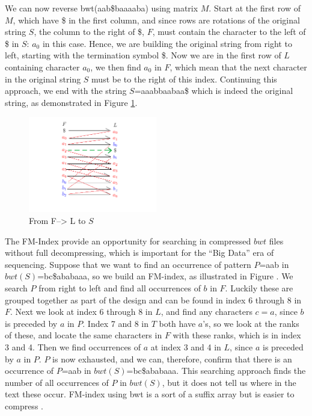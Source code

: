 \documentclass[12pt]{article} %
\begin{document}
We can now reverse bwt(aab\$baaaaba) using matrix $M$. Start at the first row of $M$, which have \$ in the first column, and since rows are rotations of the original string $S$, the column to the right of \$, $F$, must contain the character to the left of \$ in $S$: $a_0$ in this case. Hence, we are building the original string from right to left, starting with the termination symbol \$. Now we are in the first row of $L$ containing character $a_0$, we then find $a_0$ in $F$, which mean that the next character in the original string $S$ must be to the right of this index. Continuing this approach, we end with the string $S$=aaabbaabaa\$ which is indeed the original string, as demonstrated in Figure \ref{fig:bwt0}.
\begin{figure}[H]
    \centering
    \includegraphics[width=0.5\textwidth]{bwt0}
    \captionsetup{width=0.8\textwidth}
    \caption{ From F--> L to $S$}
    \label{fig:bwt0}
\end{figure}

The FM-Index provide an opportunity for searching in compressed $bwt$ files without full decompressing, which is important for the “Big Data” era of sequencing. 
Suppose that we want to find an occurrence of pattern $P$=aab in $bwt(S)$=bc\$ababaaa, so we build an FM-index, as illustrated in Figure \?.  We search $P$ from right to left and find all occurrences of $b$ in $F$. Luckily these are grouped together as part of the design and can be found in index 6 through 8 in $F$. Next we look at index 6 through 8 in $L$, and find any characters $c=a$, since $b$ is preceded by $a$ in $P$. Index 7 and 8 in $T$ both have $a$’s, so we look at the ranks of these, and locate the same characters in $F$ with these ranks, which is in index 3 and 4.  Then we find occurrences of $a$ at index 3 and 4 in $L$, since $a$ is preceded by $a$ in $P$. $P$ is now exhausted, and we can, therefore, confirm that there is an occurrence of $P$=aab in $bwt(S)$=bc\$ababaaa.  This searching approach finds the number of all occurrences of $P$ in $bwt(S)$, but it does not tell us where in the text these occur. 
FM-index using bwt is a sort of a suffix array but is easier to compress \cite{bwtfmindex}. 
\end{document}
